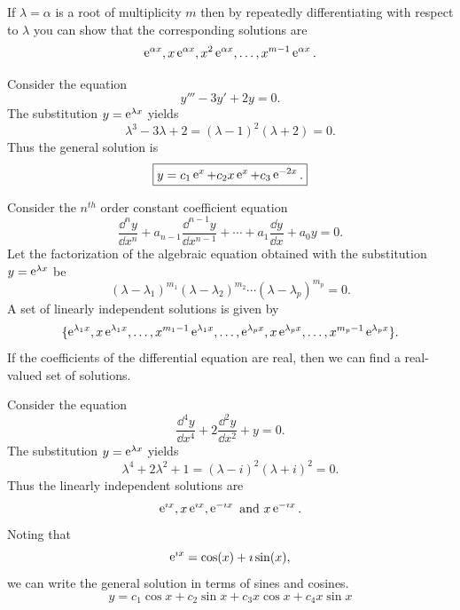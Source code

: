 If $\lambda = \alpha$ is a root of multiplicity $m$ then by repeatedly 
differentiating with respect to $\lambda$ you can show that the corresponding
solutions are 
\[ 
\mathop{\mathrm{e}}\nolimits^{\alpha x}, x \mathop{\mathrm{e}}\nolimits^{\alpha x}, x^2 \mathop{\mathrm{e}}\nolimits^{\alpha x}, \ldots, x^{m-1} \mathop{\mathrm{e}}\nolimits^{\alpha x}. 
\]







\begin{Example}
  Consider the equation
  \[ 
  y''' - 3 y' + 2 y = 0. 
  \]
  The substitution $y=\mathop{\mathrm{e}}\nolimits^{\lambda x}$ yields
  \[ 
  \lambda^3 - 3 \lambda + 2 = (\lambda-1)^2 (\lambda +2) = 0.
  \]
  Thus the general solution is
  \[ 
  \boxed{ 
    y = c_1 \mathop{\mathrm{e}}\nolimits^x + c_2 x \mathop{\mathrm{e}}\nolimits^x + c_3 \mathop{\mathrm{e}}\nolimits^{-2x}.
    } 
  \]
\end{Example}











\begin{Result}
  Consider the $n^{t h}$ order constant coefficient equation
  \[ 
  \frac{\dd^n y}{\dd x^n} + a_{n-1} \frac{\dd^{n-1} y}{\dd x^{n-1}} + 
  \cdots + a_1 \frac{\dd y}{\dd x} + a_0 y = 0. 
  \]
  Let the factorization of the algebraic equation obtained with the substitution
  $y = \mathop{\mathrm{e}}\nolimits^{\lambda x}$ be
  \[ 
  (\lambda-\lambda_1)^{m_1}(\lambda-\lambda_2)^{m_2} \cdots (\lambda-\lambda_p)^{m_p} = 0.
  \]
  A set of linearly independent solutions is given by
  \[ 
  \{\mathop{\mathrm{e}}\nolimits^{\lambda_1 x}, x \mathop{\mathrm{e}}\nolimits^{\lambda_1 x}, \ldots, x^{m_1-1} \mathop{\mathrm{e}}\nolimits^{\lambda_1 x}, 
  \ldots, \mathop{\mathrm{e}}\nolimits^{\lambda_p x}, x \mathop{\mathrm{e}}\nolimits^{\lambda_p x}, \ldots, x^{m_p-1} \mathop{\mathrm{e}}\nolimits^{\lambda_p x} \}. 
  \]
  If the coefficients of the differential equation are real, then we can 
  find a real-valued set of solutions.
\end{Result}





\begin{Example}
  Consider the equation
  \[ 
  \frac{\dd^4 y}{\dd x^4} + 2 \frac{\dd^2 y}{\dd x^2} + y = 0. 
  \]
  The substitution $y = \mathop{\mathrm{e}}\nolimits^{\lambda x}$ yields
  \[ 
  \lambda^4 + 2\lambda^2 + 1 = (\lambda-i)^2(\lambda+i)^2 = 0.
  \]
  Thus the linearly independent solutions are
  \[ 
  \e^{\imath x}, x \e^{\imath x}, \e^{-\imath x}\ \mathrm{and}\ x \e^{-\imath x}. 
  \]
  Noting that 
  \[ 
  \mathop{\mathrm{e}}\nolimits^{\imath x} = \cos(x) + \imath \sin(x),
  \]
  we can write the general solution in terms of sines and cosines.
  \[ 
  \boxed{ 
    y = c_1 \cos x + c_2 \sin x + c_3 x \cos x + c_4 x \sin x
    } 
  \]
\end{Example}










